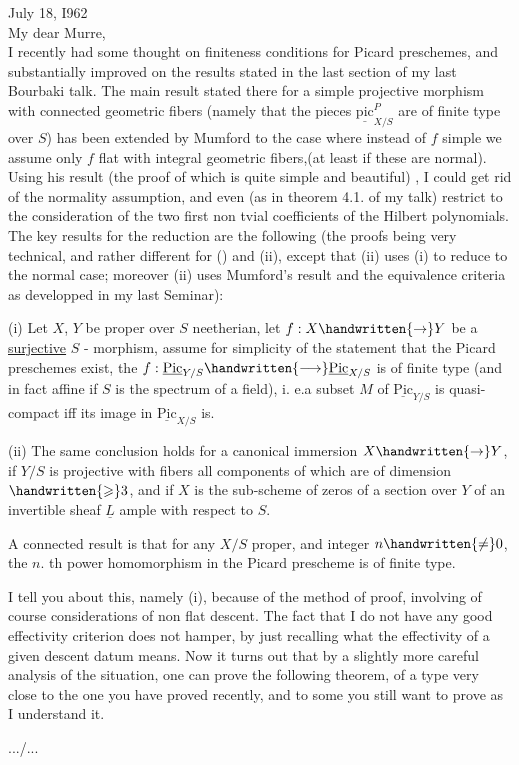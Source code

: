 July 18, I962\\

My dear Murre,\\

I recently had some thought on finiteness conditions for Picard preschemes, and substantially improved on the results stated in the last section of my last Bourbaki talk. The main result stated there for a simple projective morphism with connected geometric fibers (namely that the pieces $\underline{\mathrm{pic}}^{P}_{X/S}$ are of finite type over $S$) has been extended by Mumford to the case where instead of $f$ simple we assume only $f$ flat with integral geometric fibers,(at least if these are normal). Using his result (the proof of which is quite simple and beautiful) , I could get rid of the normality assumption, and even (as in theorem 4.1. of my talk) restrict to the consideration of the two first non tvial coefficients of the Hilbert polynomials. The key results for the reduction are the following (the proofs being very technical, and rather different for () and (ii), except that (ii) uses (i) to reduce to the normal case; moreover (ii) uses Mumford's result and the equivalence criteria as developped in my last Seminar):

(i) Let $X$, $Y$ be proper over $S$ neetherian, let $f:X\handwritten{\to}Y$ be a \uline{surjective} $S$ - morphism, assume for simplicity of the statement that the Picard preschemes exist, the $f:\underline{\mathrm{Pic}}_{Y/S}\handwritten{\longrightarrow}\underline{\mathrm{Pic}}_{X/S}$ is of finite type (and in fact affine if $S$ is the spectrum of a field), i. e.a subset $M$ of $\underline{\mathrm{Pic}}_{Y/S}$ is quasi-compact iff its image in $\underline{\mathrm{Pic}}_{X/S}$ is.

(ii) The same conclusion holds for a canonical immersion $X\handwritten{\to}Y$, if $Y/S$ is projective with fibers all components of which are of dimension $\handwritten{\geqslant}3$, and if $X$ is the sub-scheme of zeros of a section over $Y$ of an invertible sheaf $\underline{L}$ ample with respect to $S$.

A connected result is that for any $X/S$ proper, and integer $n\handwritten{\ne}0$, the $n$. th power homomorphism in the Picard prescheme is of finite type.

I tell you about this, namely (i), because of the method of proof, involving of course considerations of non flat descent. The fact that I do not have any good effectivity criterion does not hamper, by just recalling what the effectivity of a given descent datum means. Now it turns out that by a slightly more careful analysis of the situation, one can prove the following theorem, of a type very close to the one you have proved recently, and to some you still want to prove as I understand it.

\hfill .../...\par
